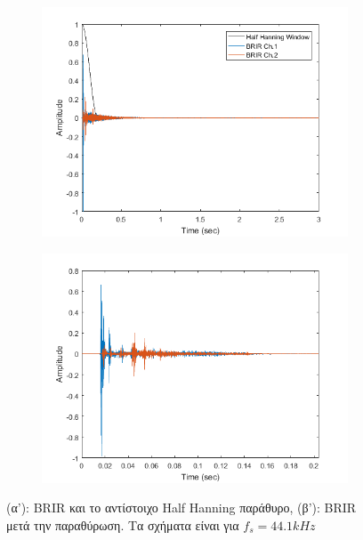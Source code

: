 \begin{figure}
     \centering
     \begin{subfigure}[b]{\textwidth}
         \centering
         \includegraphics[width=\textwidth]{images/brir_window.png}
         \caption{}
         \label{fig:brir_window}
     \end{subfigure}
     \hfill
     \begin{subfigure}[b]{\textwidth}
         \centering
         \includegraphics[width=\textwidth]{images/windowed_brir.png}
         \caption{}
         \label{fig:windowed_brir}
     \end{subfigure}
        \caption{(α'): BRIR και το αντίστοιχο Half Hanning παράθυρο, (β'): BRIR μετά την παραθύρωση. Τα σχήματα είναι για $f_s = 44.1 kHz$ }
        \label{fig:brir_processing}
\end{figure}